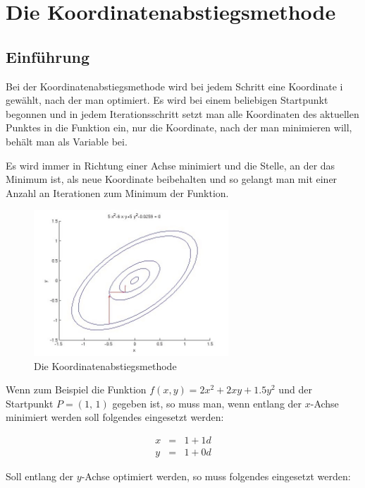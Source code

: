 \documentclass[naustrian]{article}
\begin{document}
{\begin{enumerate}
\end{enumerate}


\section{Die Koordinatenabstiegsmethode}

\subsection{Einführung}

Bei der Koordinatenabstiegsmethode wird bei jedem Schritt eine Koordinate
i gewählt, nach der man optimiert. Es wird bei einem beliebigen Startpunkt
begonnen und in jedem Iterationsschritt setzt man alle Koordinaten
des aktuellen Punktes in die Funktion ein, nur die Koordinate, nach
der man minimieren will, behält man als Variable bei.

Es wird immer in Richtung einer Achse minimiert und die Stelle, an
der das Minimum ist, als neue Koordinate beibehalten und so gelangt
man mit einer Anzahl an Iterationen zum Minimum der Funktion.

\begin{figure}[h]
    \centering
    \includegraphics[width=0.65\textwidth]{coord_desc/Coordinate_descent}
    \caption{Die Koordinatenabstiegsmethode}
\end{figure}

Wenn zum Beispiel die Funktion $f(x,y)=2x^{2}+2xy+1.5y^{2}$ und der
Startpunkt $P=(1,\,1)$ gegeben ist, so muss man, wenn entlang der
$x$-Achse minimiert werden soll folgendes eingesetzt werden:

\begin{eqnarray*}
    x & = & 1+1d\\
    y & = & 1+0d
\end{eqnarray*}


Soll entlang der $y$-Achse optimiert werden, so muss folgendes eingesetzt
werden:

}
\end{document}
